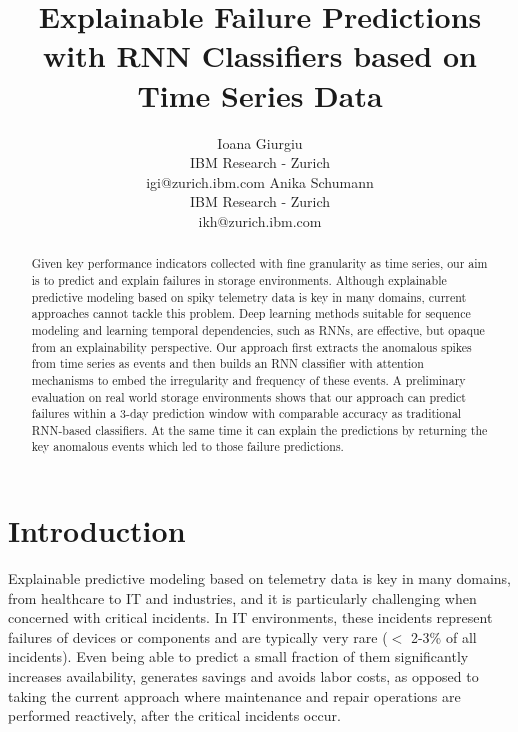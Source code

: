 \documentclass[letterpaper]{article} %
\begin{document}
\title{Explainable Failure Predictions with RNN Classifiers based on Time Series Data}
\author{Ioana Giurgiu\\
IBM Research - Zurich\\
igi@zurich.ibm.com
\And Anika Schumann\\
IBM Research - Zurich\\
ikh@zurich.ibm.com}
\maketitle
\begin{abstract}

Given key performance indicators collected with fine granularity as time series, our aim is to predict and explain failures in storage environments. Although explainable predictive modeling based on spiky telemetry data is key in many domains, current approaches cannot tackle this problem. Deep learning methods suitable for sequence modeling and learning temporal dependencies, such as RNNs, are effective, but opaque from an explainability perspective. Our approach first extracts the anomalous spikes from time series as events and then builds an RNN classifier with attention mechanisms to embed the irregularity and frequency of these events. A preliminary evaluation on real world storage environments shows that our approach can predict failures within a 3-day prediction window with comparable accuracy as traditional RNN-based classifiers. At the same time it can explain the predictions by returning the key anomalous events which led to those failure predictions.




\end{abstract}

\section{Introduction}



Explainable predictive modeling based on telemetry data is key in many domains, from healthcare to IT and industries, and it is particularly challenging when concerned with critical incidents. In IT environments, these incidents represent failures of devices or components and are typically very rare ($<$ 2-3\% of all incidents). Even being able to predict a small fraction of them significantly increases availability, generates savings and avoids labor costs, as opposed to taking the current approach where maintenance and repair operations are performed reactively, after the critical incidents occur.
\end{document}
